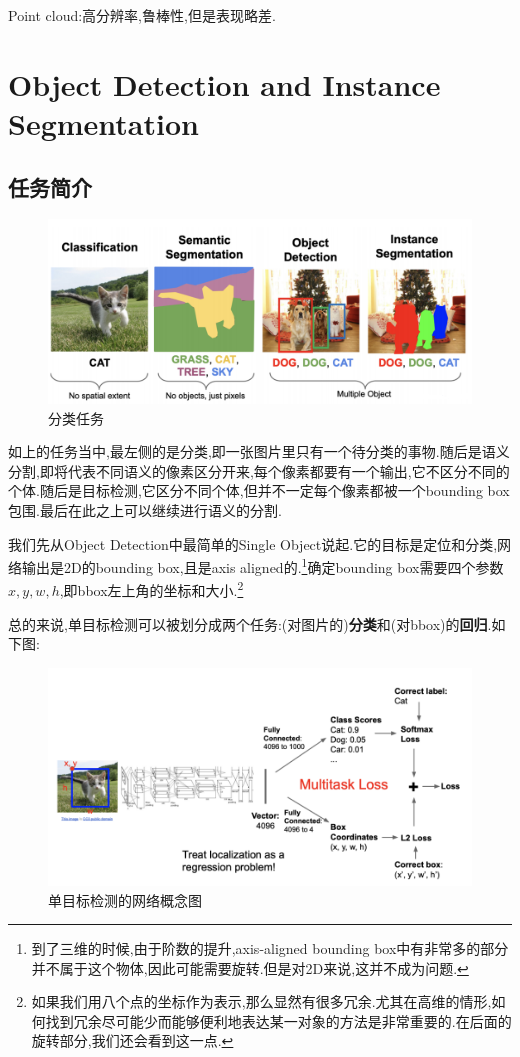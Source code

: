 	Point cloud:高分辨率,鲁棒性,但是表现略差.
	
	\clearpage
	\section{Object Detection and Instance Segmentation}
	\subsection{任务简介}
	\begin{figure}[htbp]
		\centering
		\includegraphics[scale=0.55]{figures/cv_tasks.png}
		\caption{分类任务}
		\label{}
	\end{figure}

	如上的任务当中,最左侧的是分类,即一张图片里只有一个待分类的事物.随后是语义分割,即将代表不同语义的像素区分开来,每个像素都要有一个输出,它不区分不同的个体.随后是目标检测,它区分不同个体,但并不一定每个像素都被一个bounding box包围.最后在此之上可以继续进行语义的分割.
	
	
	
	我们先从Object Detection中最简单的Single Object说起.它的目标是定位和分类,网络输出是2D的bounding box,且是axis aligned的.\footnote{到了三维的时候,由于阶数的提升,axis-aligned bounding box中有非常多的部分并不属于这个物体,因此可能需要旋转.但是对2D来说,这并不成为问题.}确定bounding box需要四个参数$x, y, w, h$,即bbox左上角的坐标和大小.\footnote{如果我们用八个点的坐标作为表示,那么显然有很多冗余.尤其在高维的情形,如何找到冗余尽可能少而能够便利地表达某一对象的方法是非常重要的.在后面的旋转部分,我们还会看到这一点.}
	
	总的来说,单目标检测可以被划分成两个任务:(对图片的)\textbf{分类}和(对bbox)的\textbf{回归}.如下图:
	\begin{figure}[htbp]
		\centering
		\includegraphics[scale=0.55]{figures/single_obj_det.png}
		\caption{单目标检测的网络概念图}
		\label{}
	\end{figure}
	
